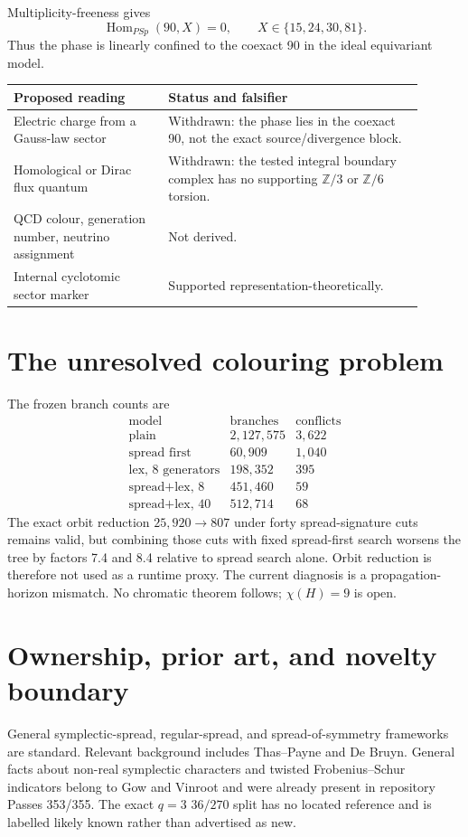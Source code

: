 \documentclass[11pt]{article}
\begin{document}
Multiplicity-freeness gives
\[
 \operatorname{Hom}_{PSp}(90,X)=0,
 \qquad X\in\{15,24,30,81\}.
\]
Thus the phase is linearly confined to the coexact 90 in the ideal equivariant
model.

\begin{table}[h]
\centering
\begin{tabular}{p{0.34\linewidth}p{0.56\linewidth}}
\toprule
Proposed reading & Status and falsifier\\
\midrule
Electric charge from a Gauss-law sector & Withdrawn: the phase lies in the
coexact 90, not the exact source/divergence block.\\
Homological or Dirac flux quantum & Withdrawn: the tested integral boundary
complex has no supporting \(\mathbb Z/3\) or \(\mathbb Z/6\) torsion.\\
QCD colour, generation number, neutrino assignment & Not derived.\\
Internal cyclotomic sector marker & Supported representation-theoretically.\\
\bottomrule
\end{tabular}
\end{table}

\section{The unresolved colouring problem}
The frozen branch counts are
\[
\begin{array}{l|r|r}
\text{model}&\text{branches}&\text{conflicts}\\\hline
\text{plain}&2{,}127{,}575&3{,}622\\
\text{spread first}&60{,}909&1{,}040\\
\text{lex, 8 generators}&198{,}352&395\\
\text{spread+lex, 8}&451{,}460&59\\
\text{spread+lex, 40}&512{,}714&68
\end{array}
\]
The exact orbit reduction \(25{,}920\to807\) under forty spread-signature cuts
remains valid, but combining those cuts with fixed spread-first search worsens
the tree by factors 7.4 and 8.4 relative to spread search alone. Orbit reduction
is therefore not used as a runtime proxy. The current diagnosis is a
propagation-horizon mismatch. No chromatic theorem follows; \(\chi(H)=9\) is
open.

\section{Ownership, prior art, and novelty boundary}
General symplectic-spread, regular-spread, and spread-of-symmetry frameworks are
standard. Relevant background includes Thas--Payne and De Bruyn. General facts
about non-real symplectic characters and twisted Frobenius--Schur indicators
belong to Gow and Vinroot and were already present in repository Passes 353/355.
The exact \(q=3\) \(36/270\) split has no located reference and is labelled
likely known rather than advertised as new.
\end{document}
